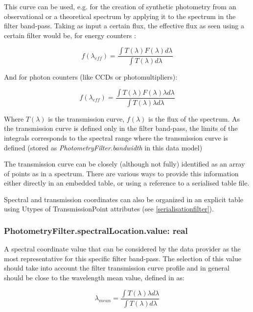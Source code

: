\documentclass[11pt,a4paper]{ivoa}
\begin{document}

\par

This curve can be used, e.g. for the creation of synthetic photometry 
\citep{1996BaltA...5..459S,2004A&A...422..205G} from an observational 
or a theoretical spectrum by applying it to the spectrum in the filter band-pass. 
Taking as input a certain flux, the effective flux as seen using a certain 
filter would be, for energy counters \citep{2007ASPC..364..227M}:

\begin{equation} \label{eq:14}
f(\lambda_{eff}) = \frac{\int T(\lambda)F(\lambda)d\lambda}{\int T(\lambda)d\lambda}
\end{equation}

And for photon counters (like CCDs or photomultipliers):

\begin{equation} \label{eq:15}
f(\lambda_{eff}) = \frac{\int T(\lambda)F(\lambda)\lambda d\lambda}{\int T(\lambda)\lambda d\lambda}
\end{equation}

Where $T(\lambda)$ is the transmission curve, $f(\lambda)$ is the flux of 
the spectrum. As the transmission curve is defined only in the filter 
band-pass, the limits of the integrals corresponds to the spectral range where 
the transmission curve is defined (stored as \textit{PhotometryFilter.bandwidth} 
in this data model)
\par

The transmission curve can be closely (although not fully) identified as an array 
of points as in a spectrum. There are various ways to provide this information 
either directly in an embedded table, or using a reference to a serialised table 
file.
\par

Spectral and transmission coordinates can also be organized  in an explicit table using 
Utypes of TransmissionPoint attributes (see \ref{serialisationfilter}).
\par

\subsubsection{PhotometryFilter.spectralLocation.value: real}
A spectral coordinate value that can be considered by the data provider as the 
most representative for this specific filter band-pass. The selection of this 
value should take into account the filter transmission curve profile and in 
general should be close to the wavelength mean value, defined 
in \citet{1982AJ.....87..670O} as:
\par
\begin{equation} \label{eq:16}
\lambda_{mean} = \frac{\int T(\lambda)\lambda d\lambda}{\int T(\lambda)d\lambda}
\end{equation}
\end{document}
